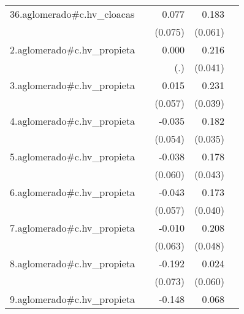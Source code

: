 {\begin{longtable}{l*{4}{D{.}{.}{-1}}}
\addlinespace
36.aglomerado#c.hv\_cloacas&                     &       0.077         &       0.183\sym{**} &                     \\
            &                     &     (0.075)         &     (0.061)         &                     \\
\addlinespace
2.aglomerado#c.hv\_propieta&                     &       0.000         &       0.216\sym{***}&                     \\
            &                     &         (.)         &     (0.041)         &                     \\
\addlinespace
3.aglomerado#c.hv\_propieta&                     &       0.015         &       0.231\sym{***}&                     \\
            &                     &     (0.057)         &     (0.039)         &                     \\
\addlinespace
4.aglomerado#c.hv\_propieta&                     &      -0.035         &       0.182\sym{***}&                     \\
            &                     &     (0.054)         &     (0.035)         &                     \\
\addlinespace
5.aglomerado#c.hv\_propieta&                     &      -0.038         &       0.178\sym{***}&                     \\
            &                     &     (0.060)         &     (0.043)         &                     \\
\addlinespace
6.aglomerado#c.hv\_propieta&                     &      -0.043         &       0.173\sym{***}&                     \\
            &                     &     (0.057)         &     (0.040)         &                     \\
\addlinespace
7.aglomerado#c.hv\_propieta&                     &      -0.010         &       0.208\sym{***}&                     \\
            &                     &     (0.063)         &     (0.048)         &                     \\
\addlinespace
8.aglomerado#c.hv\_propieta&                     &      -0.192\sym{**} &       0.024         &                     \\
            &                     &     (0.073)         &     (0.060)         &                     \\
\addlinespace
9.aglomerado#c.hv\_propieta&                     &      -0.148\sym{*}  &       0.068         &                     \\

\end{longtable}}
